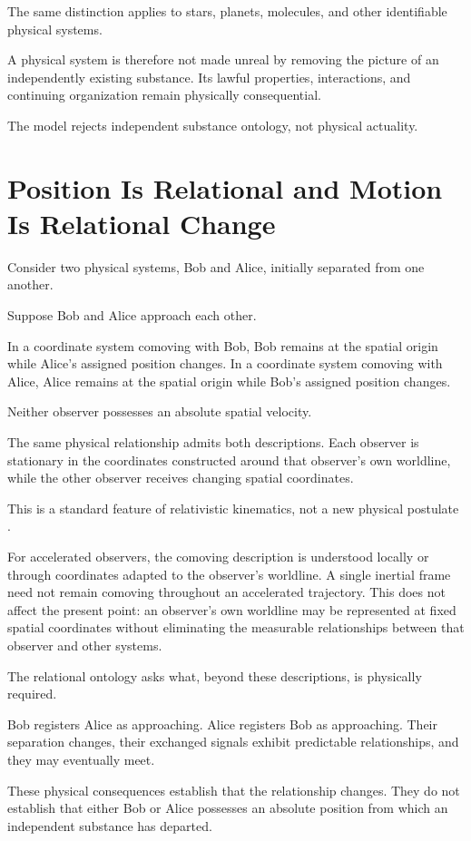 \documentclass[12pt,onecolumn]{article}
\begin{document}
The same distinction applies to stars, planets, molecules, and other identifiable physical systems.

A physical system is therefore not made unreal by removing the picture of an independently existing substance. Its lawful properties, interactions, and continuing organization remain physically consequential.

The model rejects independent substance ontology, not physical actuality.

\section{Position Is Relational and Motion Is Relational Change}

Consider two physical systems, Bob and Alice, initially separated from one another.

Suppose Bob and Alice approach each other.

In a coordinate system comoving with Bob, Bob remains at the spatial origin while Alice's assigned position changes. In a coordinate system comoving with Alice, Alice remains at the spatial origin while Bob's assigned position changes.

Neither observer possesses an absolute spatial velocity.

The same physical relationship admits both descriptions. Each observer is stationary in the coordinates constructed around that observer's own worldline, while the other observer receives changing spatial coordinates.

This is a standard feature of relativistic kinematics, not a new physical postulate \cite{TaylorWheeler,Einstein1905}.

For accelerated observers, the comoving description is understood locally or through coordinates adapted to the observer's worldline. A single inertial frame need not remain comoving throughout an accelerated trajectory. This does not affect the present point: an observer's own worldline may be represented at fixed spatial coordinates without eliminating the measurable relationships between that observer and other systems.

The relational ontology asks what, beyond these descriptions, is physically required.

Bob registers Alice as approaching. Alice registers Bob as approaching. Their separation changes, their exchanged signals exhibit predictable relationships, and they may eventually meet.

These physical consequences establish that the relationship changes. They do not establish that either Bob or Alice possesses an absolute position from which an independent substance has departed.
\end{document}
